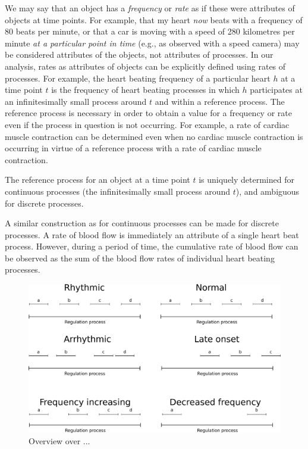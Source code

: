 \documentclass{bioinfo}
\begin{document}


We may say that an object has a {\em frequency} or {\em rate} as if
these were attributes of objects at time points. For example, that my
heart {\em now} beats with a frequency of 80 beats per minute, or that
a car is moving with a speed of 280 kilometres per minute {\em at a
  particular point in time} (e.g., as observed with a speed camera)
may be considered attributes of the objects, not attributes of
processes. In our analysis, rates as attributes of objects can be
explicitly defined using rates of processes. For example, the heart
beating frequency of a particular heart $h$ at a time point $t$ is the
frequency of heart beating processes in which $h$ participates at an
infinitesimally small process around $t$ and within a reference
process. The reference process is necessary in order to obtain a value
for a frequency or rate even if the process in question is not
occurring. For example, a rate of cardiac muscle contraction can be
determined even when no cardiac muscle contraction is occurring in
virtue of a reference process with a rate of cardiac muscle
contraction.

The reference process for an object at a time point $t$ is uniquely
determined for continuous processes (the infinitesimally small process
around $t$), and ambiguous for discrete processes.


A similar construction as for continuous processes can be made for
discrete processes. A rate of blood flow is immediately an attribute
of a single heart beat process. However, during a period of time, the
cumulative rate of blood flow can be observed as the sum of the blood
flow rates of individual heart beating processes.

\begin{figure}
  \centering
  \includegraphics[width=.5\textwidth]{processpatterns.pdf}
  \caption{Overview over ...\label{fig:patterns}}
\end{figure}
\end{document}
